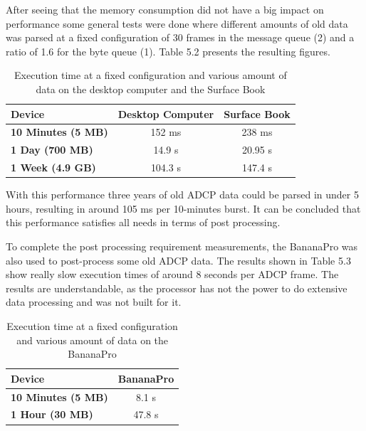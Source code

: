 \pagebreak
After seeing that the memory consumption did not have a big impact on performance some general tests were done where different amounts of old data was parsed at a fixed configuration of 30 frames in the message queue (2) and a ratio of 1.6 for the byte queue (1). Table 5.2 presents the resulting figures. 
\vspace{2em}
\begin{table}[!h]
\centering
	\begin{tabular}{|l|c|c|}
	  \hline
	  	\textbf{Device} & \textbf{Desktop Computer} & \textbf{Surface Book}\\ \hline
	  	\textbf{10 Minutes (5 MB)} & 152 ms & 238 ms\\
	  	\textbf{1 Day (700 MB)} & 14.9 s & 20.95 s\\
	  	\textbf{1 Week (4.9 GB)} & 104.3 s & 147.4 s\\
	  \hline
	\end{tabular}
	\caption{Execution time at a fixed configuration and various amount of data on the desktop computer and the Surface Book}
\end{table}
\vspace{1em}

With this performance three years of old ADCP data could be parsed in under 5 hours, resulting in around 105 ms per 10-minutes burst. It can be concluded that this performance satisfies all needs in terms of post processing.

To complete the post processing requirement measurements, the BananaPro was also used to post-process some old ADCP data. The results shown in Table 5.3 show really slow execution times of around 8 seconds per ADCP frame. The results are understandable, as the processor has not the power to do extensive data processing and was not built for it.
\vspace{2em}
\begin{table}[!h]
\centering
	\begin{tabular}{|l|c|}
	  \hline
	  	\textbf{Device} & \textbf{BananaPro}\\ \hline
	  	\textbf{10 Minutes (5 MB)} & 8.1 s \\
	  	\textbf{1 Hour (30 MB)} & 47.8 s \\
	  \hline
	\end{tabular}
	\caption{Execution time at a fixed configuration and various amount of data on the BananaPro}
\end{table}
\vspace{1em}

